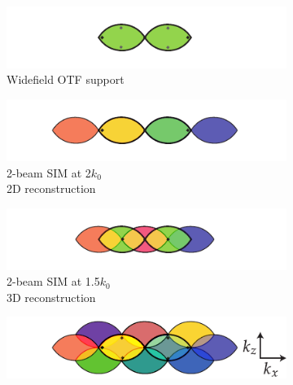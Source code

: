 \begin{figure}
    \centering
    \begin{subfigure}[t]{0.48\textwidth}
        \centering
        \includegraphics[width=1\linewidth]{./sim/axial_otf}
        \caption{Widefield OTF support}\label{fig:sim_axial_otf}
    \end{subfigure}\hfill
    \begin{subfigure}[t]{0.48\textwidth}
        \centering
        \includegraphics[width=1\linewidth]{./sim/axial_2_beam_2d}
        \caption{2-beam SIM at \SI{2}{\times}\(k_0\)\\
        2D reconstruction}\label{fig:sim_axial_2_beam_2d}
    \end{subfigure}
    \begin{subfigure}[t]{0.48\textwidth}
        \centering
        \includegraphics[width=\linewidth]{./sim/axial_2_beam_3d}
        \caption{2-beam SIM at \SI{1.5}{\times}\(k_0\)\\
        3D reconstruction}\label{fig:sim_axial_2_beam_3d}
    \end{subfigure}
    \begin{subfigure}[t]{0.48\textwidth}
        \centering
        \includegraphics[width=\linewidth]{./sim/axial_3_beam}

\end{subfigure}
\end{figure}
